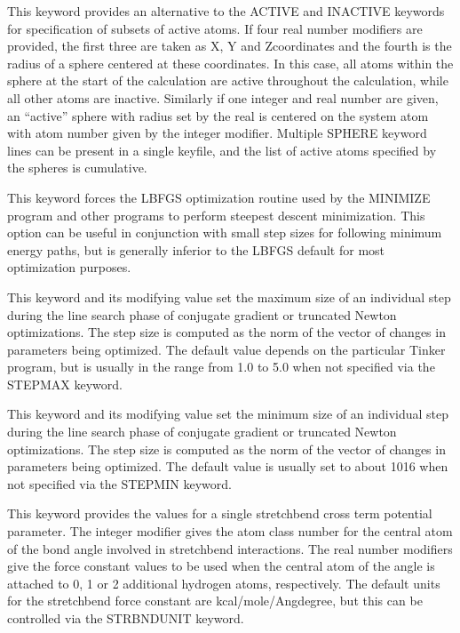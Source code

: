 \documentclass[letterpaper,11pt,english]{sphinxmanual}
\begin{document}
  This keyword provides an alternative to the ACTIVE and INACTIVE keywords for specification of subsets of active atoms. If four real number modifiers are provided, the first three are taken as X\sphinxhyphen{}, Y\sphinxhyphen{} and Z\sphinxhyphen{}coordinates and the fourth is the radius of a sphere centered at these coordinates. In this case, all atoms within the sphere at the start of the calculation are active throughout the calculation, while all other atoms are inactive. Similarly if one integer and real number are given, an “active” sphere with radius set by the real is centered on the system atom with atom number given by the integer modifier. Multiple SPHERE keyword lines can be present in a single keyfile, and the list of active atoms specified by the spheres is cumulative.

  This keyword forces the L\sphinxhyphen{}BFGS optimization routine used by the MINIMIZE program and other programs to perform steepest descent minimization. This option can be useful in conjunction with small step sizes for following minimum energy paths, but is generally inferior to the L\sphinxhyphen{}BFGS default for most optimization purposes.

  This keyword and its modifying value set the maximum size of an individual step during the line search phase of conjugate gradient or truncated Newton optimizations. The step size is computed as the norm of the vector of changes in parameters being optimized. The default value depends on the particular Tinker program, but is usually in the range from 1.0 to 5.0 when not specified via the STEPMAX keyword.

  This keyword and its modifying value set the minimum size of an individual step during the line search phase of conjugate gradient or truncated Newton optimizations. The step size is computed as the norm of the vector of changes in parameters being optimized. The default value is usually set to about 10\sphinxhyphen{}16 when not specified via the STEPMIN keyword.

  This keyword provides the values for a single stretch\sphinxhyphen{}bend cross term potential parameter. The integer modifier gives the atom class number for the central atom of the bond angle involved in stretch\sphinxhyphen{}bend interactions. The real number modifiers give the force constant values to be used when the central atom of the angle is attached to 0, 1 or 2 additional hydrogen atoms, respectively. The default units for the stretch\sphinxhyphen{}bend force constant are kcal/mole/Ang\sphinxhyphen{}degree, but this can be controlled via the STRBNDUNIT keyword.
\end{document}
